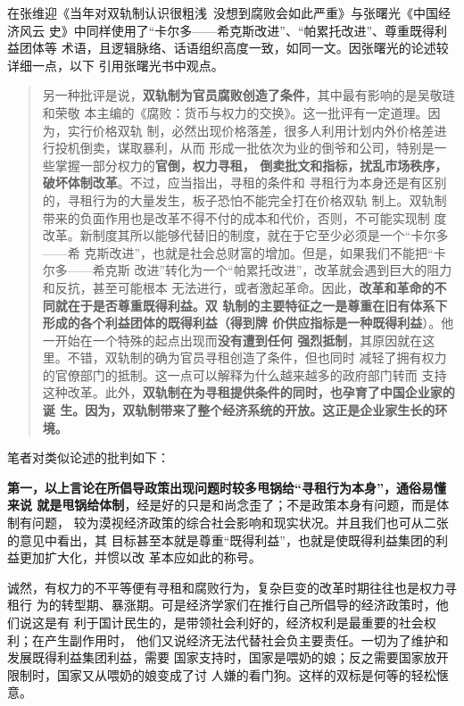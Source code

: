 在张维迎《当年对双轨制认识很粗浅\  没想到腐败会如此严重》与张曙光《中国经济风云
史》中同样使用了“卡尔多——希克斯改进”、“帕累托改进”、尊重既得利益团体等
术语，且逻辑脉络、话语组织高度一致，如同一文。因张曙光的论述较详细一点，以下
引用张曙光书中观点。
\begin{quotation}
  另一种批评是说，\textbf{双轨制为官员腐败创造了条件}，其中最有影响的是吴敬琏和荣敬
  本主编的《腐败：货币与权力的交换》。这一批评有一定道理。因为，实行价格双轨
  制，必然出现价格落差，很多人利用计划内外价格差进行投机倒卖，谋取暴利，从而
  形成一批依次为业的倒爷和公司，特别是一些掌握一部分权力的\textbf{官倒，权力寻租，
    倒卖批文和指标，扰乱市场秩序，破坏体制改革}。不过，应当指出，寻租的条件和
  寻租行为本身还是有区别的，寻租行为的大量发生，板子恐怕不能完全打在价格双轨
  制上。双轨制带来的负面作用也是改革不得不付的成本和代价，否则，不可能实现制
  度改革。新制度其所以能够代替旧的制度，就在于它至少必须是一个“卡尔多——希
  克斯改进”，也就是社会总财富的增加。但是，如果我们不能把“卡尔多——希克斯
  改进”转化为一个“帕累托改进”，改革就会遇到巨大的阻力和反抗，甚至可能根本
  无法进行，或者激起革命。因此，\textbf{改革和革命的不同就在于是否尊重既得利益。双
    轨制的主要特征之一是尊重在旧有体系下形成的各个利益团体的既得利益（得到牌
    价供应指标是一种既得利益}）。他一开始在一个特殊的起点出现而\textbf{没有遭到任何
    强烈抵制}，其原因就在这里。不错，双轨制的确为官员寻租创造了条件，但也同时
  减轻了拥有权力的官僚部门的抵制。这一点可以解释为什么越来越多的政府部门转而
  支持这种改革。此外，\textbf{双轨制在为寻租提供条件的同时，也孕育了中国企业家的诞
    生。因为，双轨制带来了整个经济系统的开放。这正是企业家生长的环
    境。}\cite[459]{fengyunshi1b}
\end{quotation}

笔者对类似论述的批判如下：

\textbf{第一，以上言论在所倡导政策出现问题时较多甩锅给“寻租行为本身”，通俗易懂来说
就是甩锅给体制}，经是好的只是和尚念歪了；不是政策本身有问题，而是体制有问题，
较为漠视经济政策的综合社会影响和现实状况。并且我们也可从二张的意见中看出，其
目标甚至本就是尊重“既得利益”，也就是使既得利益集团的利益更加扩大化，并惯以改
革本应如此的称号。

诚然，有权力的不平等便有寻租和腐败行为，复杂巨变的改革时期往往也是权力寻租行
为的转型期、暴涨期。可是经济学家们在推行自己所倡导的经济政策时，他们说这是有
利于国计民生的，是带领社会利好的，经济权利是最重要的社会权利；在产生副作用时，
他们又说经济无法代替社会负主要责任。一切为了维护和发展既得利益集团利益，需要
国家支持时，国家是喂奶的娘；反之需要国家放开限制时，国家又从喂奶的娘变成了讨
人嫌的看门狗。这样的双标是何等的轻松惬意。

